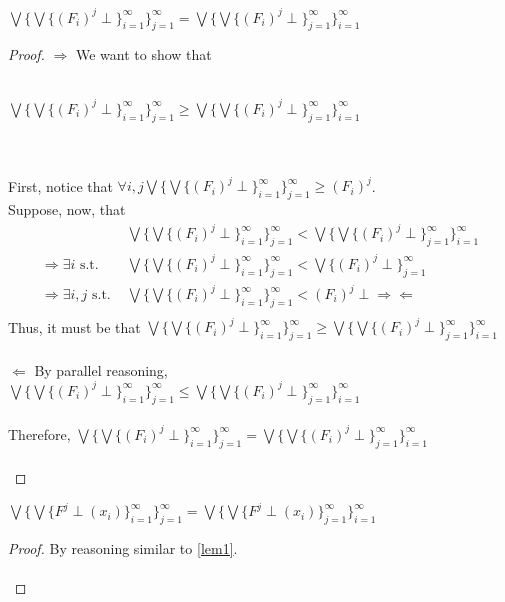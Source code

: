  \begin{lemma} $\bigvee\{\bigvee\{(F_i)^j \perp\}^{\infty}_{i=1}\}^{\infty}_{j=1}= \bigvee\{\bigvee\{(F_i)^j \perp\}^{\infty}
 \label{lem1}
 _{j=1}\}^{\infty}_{i=1}$\\
 \end{lemma}
 \begin{proof}
 $\Rightarrow$ We want to show that\\ \\ \centerline{$\bigvee\{\bigvee\{(F_i)^j \perp\}^{\infty}_{i=1}\}^{\infty}
 _{j=1} \geq  \bigvee\{\bigvee\{(F_i)^j \perp\}^{\infty}_{j=1}\}^{\infty}_{i=1}$} \\ \\ First, notice that $\forall i, j \bigvee\{\bigvee
 \{(F_i)^j \perp\}^{\infty}_{i=1}\}^{\infty}_{j=1} \geq (F_i)^j$. \\
 Suppose, now, that 
 \begin{align*}
 &\bigvee\{\bigvee\{(F_i)^j \perp\}^{\infty}_{i=1}\}^{\infty}_{j=1} < \bigvee\{\bigvee\{(F_i)^j \perp\}^{\infty}_{j=1}\}^{\infty}_{i=1}\\ 
 \Rightarrow \exists i \text{ s.t. \ \  \ } &\bigvee\{\bigvee\{(F_i)^j \perp\}^{\infty}_{i=1}\}^{\infty}_{j=1} < \bigvee\{(F_i)^j \perp\}
 ^{\infty}_{j=1}\\
 \Rightarrow \exists i, j \text{ s.t. } &\bigvee\{\bigvee\{(F_i)^j \perp\}^{\infty}_{i=1}\}^{\infty}_{j=1} < (F_i)^j \perp 
 \Rightarrow\Leftarrow\\
 \end{align*}
 Thus, it must be that $\bigvee\{\bigvee\{(F_i)^j \perp\}^{\infty}_{i=1}\}^{\infty}_{j=1} \geq  \bigvee\{\bigvee\{(F_i)^j \perp\}^{\infty}
 _{j=1}\}^{\infty}_{i=1}$ \\ \\
 $\Leftarrow$ By parallel reasoning, $\bigvee\{\bigvee\{(F_i)^j \perp\}^{\infty}_{i=1}\}^{\infty}_{j=1} \leq  \bigvee\{\bigvee\{(F_i)^j 
 \perp\}^{\infty}_{j=1}\}^{\infty}_{i=1}$ \\ \\
 Therefore, $\bigvee\{\bigvee\{(F_i)^j \perp\}^{\infty}_{i=1}\}^{\infty}_{j=1} = \bigvee\{\bigvee\{(F_i)^j \perp\}^{\infty}_{j=1}\}
 ^{\infty}_{i=1}$ \\ \\
 \end{proof}
 \begin{lemma}
 \label{lem2}
 $\bigvee\{\bigvee\{F^j \perp(x_i)\}^{\infty}_{i=1}\}^{\infty}_{j=1} = \bigvee\{\bigvee\{F^j \perp(x_i)\}^{\infty}
 _{j=1}\}^{\infty}_{i=1}$\\ 
 \end{lemma}
 \begin{proof} 
 By reasoning similar to \ref{lem1}. \\ \\
 \end{proof}
 
